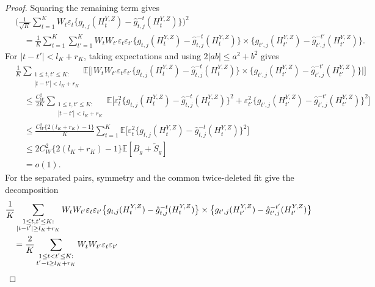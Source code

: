 \documentclass[12pt]{article}
\def\E{\mathbb{E}}
\numberwithin{equation}{section}
\begin{document}
\begin{proof}
Squaring the remaining term gives
\begin{equation}
\label{eq:exposure-square-expansion}
\begin{aligned}
&\Big(\frac1{\sqrt K}\sum_{t=1}^K W_t\varepsilon_t
\big\{g_{t,j}(H_t^{Y,Z})
      -\hat g_{t,j}^{-t}(H_t^{Y,Z})\big\}\Big)^2\\
&\quad=\frac1K\sum_{t=1}^K\sum_{t'=1}^K
W_tW_{t'}\varepsilon_t\varepsilon_{t'}
\big\{g_{t,j}(H_t^{Y,Z})
      -\hat g_{t,j}^{-t}(H_t^{Y,Z})\big\}\times
\big\{g_{t',j}(H_{t'}^{Y,Z})
      -\hat g_{t',j}^{-t'}(H_{t'}^{Y,Z})\big\}.
\end{aligned}
\end{equation}
For \(|t-t'|<l_K+r_K\), taking expectations and using
\(2|ab|\leq a^2+b^2\) gives
\begin{align*}
&\frac1K\sum_{\substack{1\leq t,t'\leq K:\\
                      |t-t'|<l_K+r_K}}
\E\Big[\Big|W_tW_{t'}\varepsilon_t\varepsilon_{t'}
\big\{g_{t,j}(H_t^{Y,Z})
      -\hat g_{t,j}^{-t}(H_t^{Y,Z})\big\}\times
\big\{g_{t',j}(H_{t'}^{Y,Z})
      -\hat g_{t',j}^{-t'}(H_{t'}^{Y,Z})\big\}\Big|\Big]\\
&\quad\leq\frac{C_W^2}{2K}
\sum_{\substack{1\leq t,t'\leq K:\\
                |t-t'|<l_K+r_K}}
\E\Big[
\varepsilon_t^2
\big\{g_{t,j}(H_t^{Y,Z})
      -\hat g_{t,j}^{-t}(H_t^{Y,Z})\big\}^2+
\varepsilon_{t'}^2
\big\{g_{t',j}(H_{t'}^{Y,Z})
      -\hat g_{t',j}^{-t'}(H_{t'}^{Y,Z})\big\}^2
\Big]\\
&\quad\leq\frac{C_W^2\{2(l_K+r_K)-1\}}K
\sum_{t=1}^K
\E\big[
\varepsilon_t^2
\big\{g_{t,j}(H_t^{Y,Z})
      -\hat g_{t,j}^{-t}(H_t^{Y,Z})\big\}^2
\big]\\
&\quad\leq
2C_W^2\{2(l_K+r_K)-1\}\E[B_g+\tilde S_g]\\
&\quad=o(1).
\end{align*}
For the separated pairs, symmetry and the common twice-deleted fit give
the decomposition
\begin{align}
&\frac1K\sum_{\substack{1\leq t,t'\leq K:\\
                      |t-t'|\geq l_K+r_K}}
W_tW_{t'}\varepsilon_t\varepsilon_{t'}
\big\{g_{t,j}(H_t^{Y,Z})
      -\hat g_{t,j}^{-t}(H_t^{Y,Z})\big\}\times
\big\{g_{t',j}(H_{t'}^{Y,Z})
      -\hat g_{t',j}^{-t'}(H_{t'}^{Y,Z})\big\}\notag\\
&\quad=\frac2K\sum_{\substack{1\leq t<t'\leq K:\\
                            t'-t\geq l_K+r_K}}
W_tW_{t'}\varepsilon_t\varepsilon_{t'}

\end{align}
\end{proof}
\end{document}
